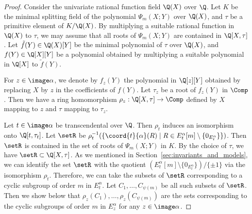 \documentclass{amsart}
\theoremstyle{definition}
\theoremstyle{remark}
\numberwithin{equation}{section}
\begin{document}
\begin{proof}
    Consider the univariate rational function field $\Q(X)$ over $\Q$.
    Let $K$ be the minimal splitting field of the polynomial
    $\Psi_m(X; Y)$ over $\Q(X)$,
    and $\tau$ be a primitive element of $K/\Q(X)$.
    By multiplying a suitable rational function in $\Q(X)$ to $\tau$,
    we may assume that all roots of $\Psi_m(X; Y)$ are contained in $\Q[X, \tau]$.
    Let $\tilde{f}(Y) \in \Q(X)[Y]$ be the minimal polynomial of $\tau$ over $\Q(X)$,
    and $f(Y) \in \Q[X][Y]$ be a polynomial obtained by multiplying
    a suitable polynomial in $\Q[X]$ to $\tilde{f}(Y)$.
    
    For $z \in \image \alpha$,
    we denote by $f_z(Y)$ the polynomial in $\Q[z][Y]$
    obtained by replacing $X$ by $z$ in the coefficients of $f(Y)$.
    Let $\tau_z$ be a root of $f_z(Y)$ in $\Comp$.
    Then we have a ring homomorphism
    $\rho_z : \Q[X, \tau] \to \Comp$
    defined by $X$ mapping to $z$ and $\tau$ mapping to $\tau_z$.

    Let $t \in \image \alpha$ be transcendental over $\Q$.
    Then $\rho_t$ induces an isomorphism onto $\Q[t, \tau_t]$.
    Let $\setR$ be $\rho_t^{-1}(\{\coord{t}{\alpha}(R) \mid R \in E_t^\alpha[m]\setminus\{0_{E_t^\alpha}\}\})$.
    Then $\setR$ is contained in the set of roots of $\Psi_m(X; Y)$ in $K$.
    By the choice of $\tau$,
    we have $\setR \subset \Q[X, \tau]$.
    As we mentioned in Section~\ref{sec:invariants_and_models},
    we can identify the set $\setR$ with the quotient
    $(E_t^\alpha[m]\setminus\{0_{E_t^\alpha}\})/\{\pm 1\}$
    via the isomorphism $\rho_t$.
    Therefore, we can take the subsets of $\setR$
    corresponding to a cyclic subgroup of order $m$ in $E_t^\alpha$.
    Let $C_1, \dots, C_{\psi(m)}$ be all such subsets of $\setR$.
    Then we show below that
    $\rho_{z}(C_1), \dots, \rho_{z}(C_{\psi(m)})$
    are the sets corresponding to
    the cyclic subgroups of order $m$ in $E_{z}^\alpha$
    for any $z \in \image \alpha$.


\end{proof}
\end{document}
